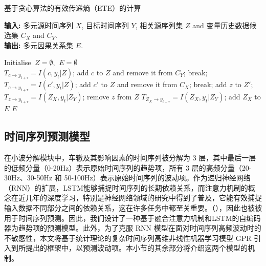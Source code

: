 \begin{algorithm}[htb]
\caption{基于贪心算法的有效传递熵（ETE）的计算}
\label{alg:SA1}
\hspace*{0.02in} {\bf 输入:} 多元源时间序列 $X$, 目标时间序列 $Y$, 相关源序列集 $Z$ and 变量历史数据候选集 $C_{X}$ and $C_{Y}$.\\
\hspace*{0.02in} {\bf 输出:} 多元因果关系集 $E$.\\
\begin{algorithmic}[1]
\STATE Initialise $\ Z=\emptyset$,  $\ E=\emptyset$
\\

    \STATE $T_{c\rightarrow y_{t+ \tau}} = I(c,y_{t}|Z)$;
        \STATE add $c$ to $Z$ and remove it from $C_{Y}$;
    \ELSE
        \STATE break;
    \ENDIF
\ENDFOR
{}
    \STATE $T_{c\rightarrow y_{t+ \tau}} = I(c',y_{t}|Z)$;
        \STATE add $c'$ to $Z$ and remove it from $C_{X}$;
    \ELSE
        \STATE break;
    \ENDIF
\ENDFOR
{}
    \STATE add $z$ to $Z'$;
    \STATE $T_{z\rightarrow y_{t+ \tau}} = I(Z_{X},y_{t}|Z_{Y})$;
        \STATE remove $z$ from $Z$
    \ENDIF
\ENDFOR
\STATE $T_{Z_{X}\rightarrow y_{t+ \tau}} = I(Z_{X},y_{t}|Z_{Y})$;
    \STATE add $Z_{X}$ to $E$
\ENDIF
\RETURN $E$
\end{algorithmic}
\end{algorithm}


\subsection{时间序列预测模型}
在小波分解模块中，车辙及其影响因素的时间序列被分解为 3 层，其中最后一层的低频分量（0-20Hz）表示原始时间序列的趋势项，所有 3 层的高频分量（20-30Hz、30-50Hz 和 50-100Hz）表示原始时间序列的波动项。作为递归神经网络（RNN）的扩展，LSTM能够捕捉时间序列的长期依赖关系，而注意力机制的概念在近几年的深度学习，特别是神经网络领域的研究中得到了普及，它能有效捕捉输入数据不同部分之间的依赖关系，这在许多任务中都至关重要。（\cite{33}），因此也被被用于时间序列预测。因此，我们设计了一种基于融合注意力机制和LSTM的自编码器为趋势项的预测模型。此外，为了克服 RNN 模型在面对时间序列高频波动时的不敏感性，本文将基于统计理论的复杂时间序列高维非线性机器学习模型 GPR 引入到所提出的框架中，以预测波动项。本小节的其余部分将介绍这两个模型的机制。

